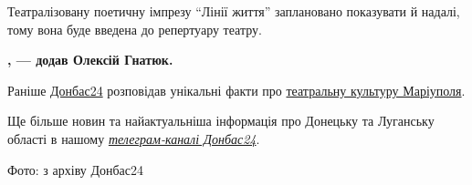 
Театралізовану поетичну імпрезу \enquote{Лінії життя} заплановано показувати й надалі,
тому вона буде введена до репертуару театру.

\begin{leftbar}
	\begingroup
		\bfseries
{}, —
додав Олексій Гнатюк.
	\endgroup
\end{leftbar}


Раніше \href{https://donbas24.news}{Донбас24} розповідав унікальні факти про \href{https://donbas24.news/news/unikalni-fakti-pro-teatralnu-kulturu-priazovya-do-vsesvitnyogo-dnya-teatru}{театральну культуру Маріуполя}.

Ще більше новин та найактуальніша інформація про Донецьку та Луганську області
в нашому \emph{\href{https://t.me/donbas24}{телеграм-каналі Донбас24}}.

Фото: з архіву Донбас24

